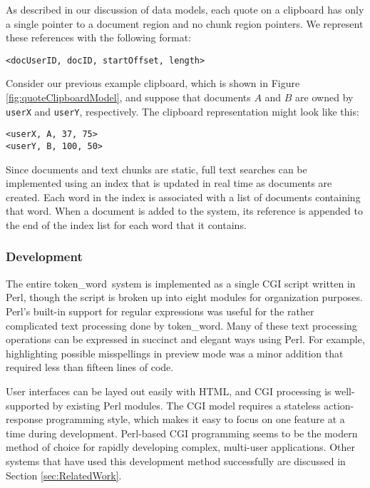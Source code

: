 \documentclass{acm_proc_article-sp}
\newcommand{\tw}{token\_word}
\begin{document}
As described in our discussion of data models, each quote on a clipboard has only a single pointer to a document region and no chunk region pointers.
We represent these references with the following format:
\begin{center}
\texttt{<docUserID, docID, startOffset, length>} 
\end{center}
Consider our previous example clipboard, which is shown in Figure \ref{fig:quoteClipboardModel}, and suppose that documents $A$ and  $B$ are owned by \texttt{userX} and \texttt{userY}, respectively.
The clipboard representation might look like this:
\begin{center}
\texttt{<userX, A, 37, 75>}\\
\texttt{<userY, B, 100, 50>}\\ 
\end{center}




Since documents and text chunks are static, full text searches can be implemented using an index that is updated in real time as documents are created.
Each word in the index is associated with a list of documents containing that word.
When a document is added to the system, its reference is appended to the end of the index list for each word that it contains.


\subsubsection{Development}
The entire \tw \   system is implemented as a single CGI script written in Perl, though the script is broken up into eight modules for organization purposes.
Perl's built-in support for regular expressions was useful for the rather complicated text processing done by \tw.
Many of these text processing operations can be expressed in succinct and elegant ways using Perl.
For example, highlighting possible misspellings in preview mode was a minor addition that required less than fifteen lines of code.

User interfaces can be layed out easily with HTML, and CGI processing is well-supported by existing Perl modules.
The CGI model requires a stateless action-response programming style, which makes it easy to focus on one feature at a time during development.
Perl-based CGI programming seems to be the modern method of choice for rapidly developing complex, multi-user applications.
Other systems that have used this development method successfully are discussed in Section \ref{sec:RelatedWork}.
\end{document}
